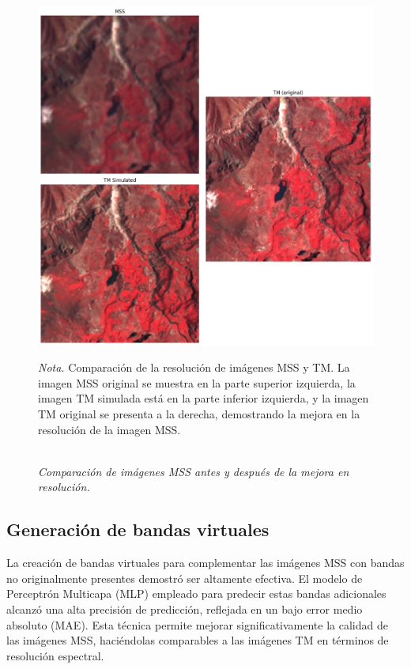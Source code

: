             \begin{figure}[H] 
                \caption{\doublespacing \\ \textit{Comparación de imágenes MSS antes y después de la mejora en resolución.}} 
                \centering
                \includegraphics[width=0.8\linewidth]{2_CAPITULO5/IMG/espectral2.png}
                \begin{justify}
                    \textit{Nota.} Comparación de la resolución de imágenes MSS y TM. La imagen MSS original se muestra en la parte superior izquierda, la imagen TM simulada está en la parte inferior izquierda, y la imagen TM original se presenta a la derecha, demostrando la mejora en la resolución de la imagen MSS.
                \end{justify}                    
                \label{armonizacion2}
            \end{figure}
            


        \subsection{Generación de bandas virtuales}
            La creación de bandas virtuales para complementar las imágenes MSS con bandas no originalmente presentes demostró ser altamente efectiva. El modelo de Perceptrón Multicapa (MLP) empleado para predecir estas bandas adicionales alcanzó una alta precisión de predicción, reflejada en un bajo error medio absoluto (MAE). Esta técnica permite mejorar significativamente la calidad de las imágenes MSS, haciéndolas comparables a las imágenes TM en términos de resolución espectral.

